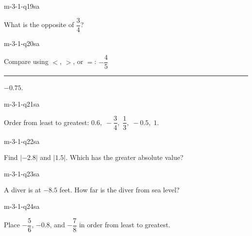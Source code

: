 \begin{practiceQuestion}{m-3-1-q19}{sa}
\begin{questionText}
What is the opposite of $\dfrac{3}{4}$?
\end{questionText}
\end{practiceQuestion}

\begin{practiceQuestion}{m-3-1-q20}{sa}
\begin{questionText}
Compare using $<$, $>$, or $=$: $-\dfrac{4}{5}$ \rule{0.5cm}{0.4pt} $-0.75$.
\end{questionText}
\correctAnswer{$<$}
\end{practiceQuestion}

\begin{practiceQuestion}{m-3-1-q21}{sa}
\begin{questionText}
Order from least to greatest: $0.6, \; -\dfrac{3}{4}, \; \dfrac{1}{3}, \; -0.5, \; 1$.
\end{questionText}
\end{practiceQuestion}

\begin{practiceQuestion}{m-3-1-q22}{sa}
\begin{questionText}
Find $|{-2.8}|$ and $|1.5|$. Which has the greater absolute value?
\end{questionText}
\end{practiceQuestion}

\begin{practiceQuestion}{m-3-1-q23}{sa}
\begin{questionText}
A diver is at $-8.5$ feet. How far is the diver from sea level?
\end{questionText}
\end{practiceQuestion}

\begin{practiceQuestion}{m-3-1-q24}{sa}
\begin{questionText}
Place $-\dfrac{5}{6}$, $-0.8$, and $-\dfrac{7}{8}$ in order from least to greatest.
\end{questionText}
\end{practiceQuestion}

